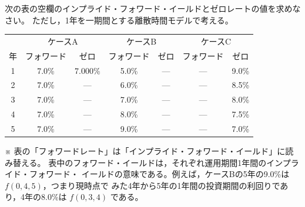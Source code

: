 \begin{exercise}
次の表の空欄のインプライド・フォワード・イールドとゼロレートの値を求めなさい。
ただし，1年を一期間とする離散時間モデルで考える。
\vspace{0.9em}
\begin{center}
\small
\begin{tabular}{c|cc|cc|cc}
\toprule
 & \multicolumn{2}{c|}{ケースA} & \multicolumn{2}{c|}{ケースB}
 & \multicolumn{2}{c}{ケースC}\\
年 & フォワード & ゼロ & フォワード & ゼロ & フォワード & ゼロ\\
\midrule
1 & 7.0\% & 7.000\% & 5.0\% & --- & --- & 9.0\%\\
2 & 7.0\% & --- & 6.0\% & --- & --- & 8.5\%\\
3 & 7.0\% & --- & 7.0\% & --- & --- & 8.0\%\\
4 & 7.0\% & --- & 8.0\% & --- & --- & 7.5\%\\
5 & 7.0\% & --- & 9.0\% & --- & --- & 7.0\%\\
\bottomrule
\end{tabular}
\end{center}
\vspace{0.9em}
※ 表の「フォワードレート」は「インプライド・フォワード・イールド」に読み替える。
表中のフォワード・イールドは，それぞれ運用期間1年間のインプライド・フォワード・
イールドの意味である。例えば，ケースBの5年の9.0\%は $f(0,4,5)$，つまり現時点で
みた4年から5年の1年間の投資期間の利回りであり，4年の8.0\%は $f(0,3,4)$ である。
\end{exercise}

